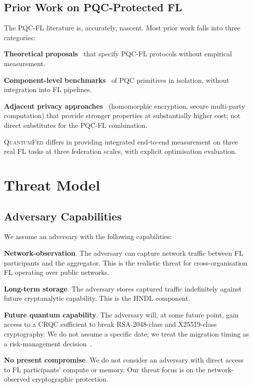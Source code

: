 \documentclass[sigconf,nonacm]{acmart}
\begin{document}
\subsection{Prior Work on PQC-Protected FL}

The PQC-FL literature is, accurately, nascent. Most prior work falls
into three categories:

\textbf{Theoretical proposals}~\cite{xu2024pqcfl} that specify PQC-FL
protocols without empirical measurement.

\textbf{Component-level benchmarks}~\cite{kannwischer2024pqm4} of PQC
primitives in isolation, without integration into FL pipelines.

\textbf{Adjacent privacy approaches}~\cite{kim2024fhefl} (homomorphic
encryption, secure multi-party computation) that provide stronger
properties at substantially higher cost; not direct substitutes for
the PQC-FL combination.

\textsc{QuantumFed} differs in providing integrated end-to-end
measurement on three real FL tasks at three federation scales, with
explicit optimisation evaluation.

\section{Threat Model}

\subsection{Adversary Capabilities}

We assume an adversary with the following capabilities:

\textbf{Network-observation}. The adversary can capture network
traffic between FL participants and the aggregator. This is the
realistic threat for cross-organisation FL operating over public
networks.

\textbf{Long-term storage}. The adversary stores captured traffic
indefinitely against future cryptanalytic capability. This is the
HNDL component.

\textbf{Future quantum capability}. The adversary will, at some
future point, gain access to a CRQC sufficient to break
RSA-2048-class and X25519-class cryptography. We do not assume a
specific date; we treat the migration timing as a risk-management
decision~\cite{mosca2024quantum}.

\textbf{No present compromise}. We do not consider an adversary with
direct access to FL participants' compute or memory. Our threat
focus is on the network-observed cryptographic protection.
\end{document}
